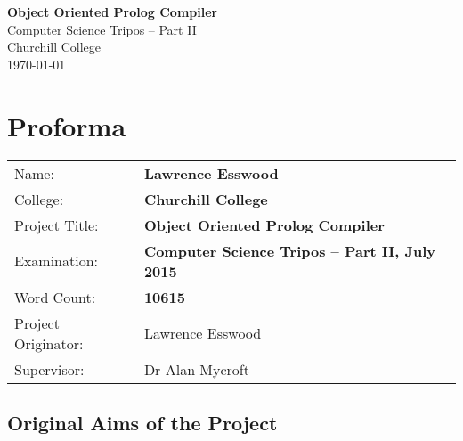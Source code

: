 \documentclass[12pt,a4paper,twoside,openright]{report}
\begin{document}
\EnableBpAbbreviations
\makeatletter \renewcommand{\@cite}[1]{\textsuperscript{\,[#1]}} \makeatother



\lstset{language=Prolog}
\lstset{showstringspaces=false}
\lstset{basicstyle=\tt}
 


\pagestyle{empty}


\vspace*{60mm}
\begin{center}
\Huge
\textbf{Object Oriented Prolog Compiler} \\[5mm]
Computer Science Tripos -- Part II \\[5mm]
Churchill College \\[5mm]
\today  %
\end{center}



\pagestyle{plain}

\chapter*{Proforma}

{\large
\begin{tabular}{ll}
Name:               & \bf Lawrence Esswood                       \\
College:            & \bf Churchill College                     \\
Project Title:      & \bf Object Oriented Prolog Compiler \\
Examination:        & \bf Computer Science Tripos -- Part II, July 2015  \\
Word Count:         & \bf 10615 \\
Project Originator: & Lawrence Esswood                    \\
Supervisor:         & Dr Alan Mycroft                    \\ 
\end{tabular}
}


\section*{Original Aims of the Project}
\end{document}
